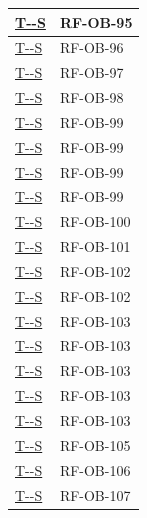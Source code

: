 \documentclass[a4paper,12pt]{article}
\newcounter{testsys}
\newcommand{\systestref}{%
  \hyperlink{T-\arabic{testsys}-S}{T-\arabic{testsys}-S}%
}
\begin{document}
\begin{longtable}{|>{\centering\arraybackslash}p{5cm}|>{\centering\arraybackslash}p{9cm}|}
\stepcounter{testsys}
\systestref & RF-OB-95 \\
\hline

\stepcounter{testsys}
\systestref & RF-OB-96 \\
\hline

\stepcounter{testsys}
\systestref & RF-OB-97 \\
\hline

\stepcounter{testsys}
\systestref & RF-OB-98 \\
\hline

\stepcounter{testsys}
\systestref & RF-OB-99 \\
\hline

\stepcounter{testsys}
\systestref & RF-OB-99 \\
\hline

\stepcounter{testsys}
\systestref & RF-OB-99 \\
\hline

\stepcounter{testsys}
\systestref & RF-OB-99 \\
\hline

\stepcounter{testsys}
\systestref & RF-OB-100 \\
\hline

\stepcounter{testsys}
\systestref & RF-OB-101 \\
\hline

\stepcounter{testsys}
\systestref & RF-OB-102 \\
\hline

\stepcounter{testsys}
\systestref & RF-OB-102 \\
\hline

\stepcounter{testsys}
\systestref & RF-OB-103 \\
\hline

\stepcounter{testsys}
\systestref & RF-OB-103 \\
\hline

\stepcounter{testsys}
\systestref & RF-OB-103 \\
\hline

\stepcounter{testsys}
\systestref & RF-OB-103 \\
\hline

\stepcounter{testsys}
\systestref & RF-OB-103 \\
\hline

\stepcounter{testsys}
\systestref & RF-OB-105 \\
\hline

\stepcounter{testsys}
\systestref & RF-OB-106 \\
\hline

\stepcounter{testsys}
\systestref & RF-OB-107 \\
\hline


\end{longtable}
\end{document}
